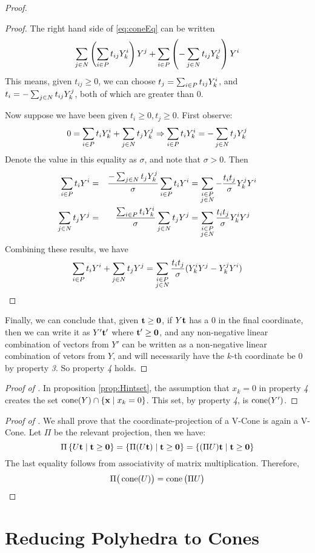 \begin{proof}
\begin{proof}
		The right hand side of \eqref{eq:coneEq} can be written
		\[ \sum_{j\in N} \left(\sum_{i\in P} t_{ij}Y^i_{k}\right) Y^j +
			\sum_{i\in P} \left(-\sum_{j\in N} t_{ij}Y^j_{k}\right) Y^i \]
		This means, given $t_{ij} \geq 0$, we can choose $t_j = \sum_{i\in P} t_{ij}Y^i_{k}$, and $t_i = -\sum_{j\in N} t_{ij}Y^j_{k}$, both of which are greater than $0$.

		Now suppose we have been given $t_i \geq 0, t_j \geq 0$.  First observe:
		\[ 0 = \sum_{i\in P} t_iY^i_{k} + \sum_{j\in N} t_jY^j_{k} \Rightarrow \sum_{i\in P} t_iY^i_{k} = -\sum_{j\in N} t_jY^j_{k}\]
		Denote the value in this equality as $\sigma$, and note that $\sigma > 0$.  Then
		\begin{alignat*}{3}
			\sum_{i\in P} t_i Y^i & = & \frac{-\sum_{j\in N} t_j Y^j_{k}}{\sigma}\sum_{i\in P} t_i Y^i & =
			\sum_{\substack{i\in P \\ j\in N}} -\frac{t_i t_j}{\sigma}Y^j_{k} Y^i                              \\
			\sum_{j\in N} t_j Y^j & = & \frac{\sum_{i\in P} t_i Y^i_{k}}{\sigma}\sum_{j\in N} t_j Y^j  & =
			\sum_{\substack{i\in P \\ j\in N}} \frac{t_i t_j}{\sigma}Y^i_{k} Y^j
		\end{alignat*}
		Combining these results, we have
		\[ \sum_{i\in P} t_i Y^i + \sum_{j\in N} t_j Y^j =
			\sum_{\substack{i\in P \\ j\in N}} \frac{t_i t_j}{\sigma}(Y^i_{k} Y^j - Y^j_{k} Y^i) \]
	\end{proof}
	Finally, we can conclude that, given $\mathbf{t} \geq \mathbf{0}$, if $ Y\mathbf{t}$ has a $0$ in the final coordinate, then we can write it as $ Y'\mathbf{t}'$ where $\mathbf{t}' \geq \mathbf{0}$, and any non-negative linear combination of vectors from $Y'$ can be written as a non-negative linear combination of vetors from $Y$, and will necessarily have the $k$-th coordinate be $0$ by property \textit{3}.  So property \textit{4} holds.
\end{proof}

\begin{proof}[Proof of {\Hint}]
	In proposition \ref{prop:Hintset}, the assumption that $x_k = 0$ in property \textit{4} creates the set $\operatorname{cone}(Y) \cap \left\{\mathbf{x} \;|\; x_k = 0\right\}$.  This set, by property \textit{4}, is $\operatorname{cone}(Y')$.
\end{proof}

\begin{proof}[Proof of {\Hproj}]
	We shall prove that the coordinate-projection of a V-Cone is again a V-Cone.  Let $\Pi$ be the relevant projection, then we have:
	\[ \Pi\left\{U\mathbf{t} \;|\; \mathbf{t} \geq \mathbf{0}\right\} = \left\{\Pi(U\mathbf{t}) \;|\; \mathbf{t} \geq \mathbf{0}\right\} =
		\left\{(\Pi U)\mathbf{t} \;|\; \mathbf{t} \geq \mathbf{0}\right\} \]
	The last equality follows from associativity of matrix multiplication.  Therefore,
	\[ \Pi\big(\operatorname{cone}(U)\big) = \operatorname{cone}\big(\Pi U\big) \]
\end{proof}

\section{Reducing Polyhedra to Cones}

